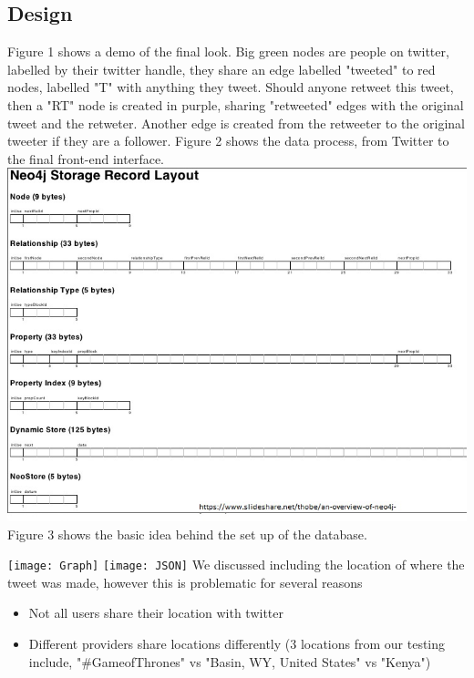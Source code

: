 \documentclass[11pt]{article}
\begin{document}
\subsection{Design}

Figure 1 shows a demo of the final look. Big green nodes are people on twitter, labelled by their twitter handle, they share an edge labelled "tweeted" to red nodes, labelled "T" with anything they tweet. Should anyone retweet this tweet, then a "RT" node is created in purple, sharing "retweeted" edges with the original tweet and the retweter. Another edge is created from the retweeter to the original tweeter if they are a follower.
\newline
Figure 2 shows the data process, from Twitter to the final front-end interface. \newline
\includegraphics[scale=0.70]{Detail}
Figure 3 shows the basic idea behind the set up of the database.\newline

\texttt{[image: Graph]}\newline
\texttt{[image: JSON]}
We discussed including the location of where the tweet was made, however this is problematic for several reasons
\begin{itemize}
\item Not all users share their location with twitter
\item Different providers share locations differently (3 locations from our testing include, "\#GameofThrones" vs "Basin, WY, United States" vs "Kenya")
\end{itemize}
\end{document}
